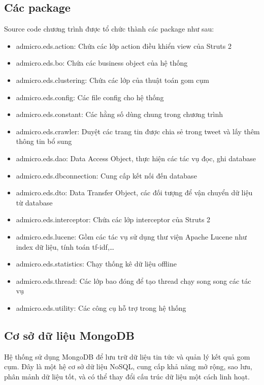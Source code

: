 	\subsection{Các package}
	Source code chương trình được tổ chức thành các package như sau:
	\begin{itemize}
		\item admicro.eds.action: Chứa các lớp action điều khiển view của Struts 2
		\item admicro.eds.bo: Chứa các business object của hệ thống
		\item admicro.eds.clustering: Chứa các lớp của thuật toán gom cụm
		\item admicro.eds.config: Các file config cho hệ thống
		\item admicro.eds.constant: Các hằng số dùng chung trong chương trình
		\item admicro.eds.crawler: Duyệt các trang tin được chia sẻ trong tweet và lấy thêm thông tin bổ sung
		\item admicro.eds.dao: Data Access Object, thực hiện các tác vụ đọc, ghi database
		\item admicro.eds.dbconnection: Cung cấp kết nối đến database
		\item admicro.eds.dto: Data Transfer Object, các đối tượng để vận chuyển dữ liệu từ database
		\item admicro.eds.interceptor: Chứa các lớp interceptor của Struts 2
		\item admicro.eds.lucene: Gồm các tác vụ sử dụng thư viện Apache Lucene như index dữ liệu, tính toán tf-idf,…
		\item admicro.eds.statistics: Chạy thống kê dữ liệu offline
		\item admicro.eds.thread: Các lớp bao đóng để tạo thread chạy song song các tác vụ
		\item admicro.eds.utility: Các công cụ hỗ trợ trong hệ thống
	\end{itemize}
	
	\subsection{Cơ sở dữ liệu MongoDB}
	Hệ thống sử dụng MongoDB để lưu trữ dữ liệu tin tức và quản lý kết quả gom cụm. Đây là một hệ cơ sở dữ liệu NoSQL, cung cấp khả năng mở rộng, sao lưu, phân mảnh dữ liệu tốt, và có thể thay đổi cấu trúc dữ liệu một cách linh hoạt.
	
